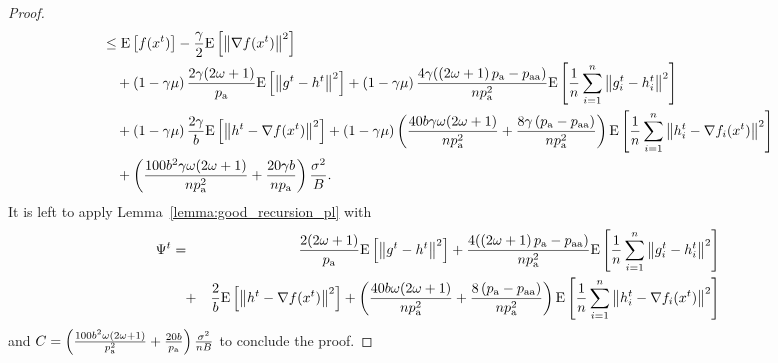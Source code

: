 \documentclass{article}
\newcommand*{\probavailable}{\ensuremath{p_{\textnormal{a}}}}
\newcommand*{\probpairaa}{\ensuremath{p_{\textnormal{aa}}}}
\begin{document}
\begin{proof}
\begin{align*}
        &\leq \Exp{f(x^t)} - \frac{\gamma}{2}\Exp{\norm{\nabla f(x^t)}^2} \\
        &\quad + \left(1 - \gamma \mu\right)\frac{2\gamma (2 \omega + 1)}{\probavailable} \Exp{\norm{g^{t} - h^{t}}^2} + \left(1 - \gamma \mu\right)\frac{4\gamma (\left(2 \omega + 1\right)\probavailable - \probpairaa)}{n \probavailable^2} \Exp{\frac{1}{n}\sum_{i=1}^n\norm{g^{t}_i - h^{t}_i}^2} \\
        &\quad + \left(1 - \gamma \mu\right)\frac{2\gamma}{b} \Exp{\norm{h^{t} - \nabla f(x^{t})}^2} + \left(1 - \gamma \mu\right)\left(\frac{40 b \gamma \omega (2 \omega + 1)}{n \probavailable^2} + \frac{8 \gamma \left(\probavailable - \probpairaa\right)}{n \probavailable^2}\right)\Exp{\frac{1}{n}\sum_{i=1}^n\norm{h^{t}_i - \nabla f_i(x^{t})}^2} \\
        &\quad + \left(\frac{100 b^2 \gamma \omega (2 \omega + 1)}{n \probavailable^2} + \frac{20 \gamma b}{n \probavailable}\right) \frac{\sigma^2}{B}.
      \end{align*}
      It is left to apply Lemma~\ref{lemma:good_recursion_pl} with 
      \begin{eqnarray*}
        \Psi^t &=& \frac{2 (2 \omega + 1)}{\probavailable} \Exp{\norm{g^{t} - h^{t}}^2} + \frac{4 (\left(2 \omega + 1\right)\probavailable - \probpairaa)}{n \probavailable^2} \Exp{\frac{1}{n}\sum_{i=1}^n\norm{g^{t}_i - h^{t}_i}^2} \\
        &\quad +& \frac{2}{b} \Exp{\norm{h^{t} - \nabla f(x^{t})}^2} + \left(\frac{40 b \omega (2 \omega + 1)}{n \probavailable^2} + \frac{8 \left(\probavailable - \probpairaa\right)}{n \probavailable^2}\right)\Exp{\frac{1}{n}\sum_{i=1}^n\norm{h^{t}_i - \nabla f_i(x^{t})}^2}
      \end{eqnarray*}
      and $C = \left(\frac{100 b^2 \omega (2 \omega + 1)}{\probavailable^2} + \frac{20 b}{\probavailable}\right) \frac{\sigma^2}{n B}$
      to conclude the proof.
    \end{proof}

    \CONVERGENCEPLSTOCHASTICRANDK*

\end{document}
